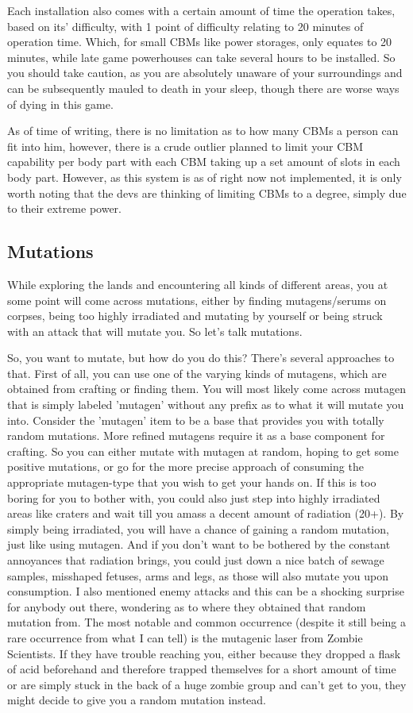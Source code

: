 \documentclass[11pt]{report}
\begin{document}
Each installation also comes with a certain amount of time the operation takes, based on its' difficulty, with 1 point of difficulty relating to 20 minutes of operation time. Which, for small CBMs like power storages, only equates to 20 minutes, while late game powerhouses can take several hours to be installed. So you should take caution, as you are absolutely unaware of your surroundings and can be subsequently mauled to death in your sleep, though there are worse ways of dying in this game.

As of time of writing, there is no limitation as to how many CBMs a person can fit into him, however, there is a crude outlier planned to limit your CBM capability per body part with each CBM taking up a set amount of slots in each body part. However, as this system is as of right now not implemented, it is only worth noting that the devs are thinking of limiting CBMs to a degree, simply due to their extreme power.

\subsection{Mutations}

While exploring the lands and encountering all kinds of different areas, you at some point will come across mutations, either by finding mutagens/serums on corpses, being too highly irradiated and mutating by yourself or being struck with an attack that will mutate you. So let's talk mutations.

So, you want to mutate, but how do you do this?
There's several approaches to that. First of all, you can use one of the varying kinds of mutagens, which are obtained from crafting or finding them. You will most likely come across mutagen that is simply labeled 'mutagen' without any prefix as to what it will mutate you into. Consider the 'mutagen' item to be a base that provides you with totally random mutations. More refined mutagens require it as a base component for crafting. So you can either mutate with mutagen at random, hoping to get some positive mutations, or go for the more precise approach of consuming the appropriate mutagen-type that you wish to get your hands on.
If this is too boring for you to bother with, you could also just step into highly irradiated areas like craters and wait till you amass a decent amount of radiation (20+). By simply being irradiated, you will have a chance of gaining a random mutation, just like using mutagen.
And if you don't want to be bothered by the constant annoyances that radiation brings, you could just down a nice batch of sewage samples, misshaped fetuses, arms and legs, as those will also mutate you upon consumption.
I also mentioned enemy attacks and this can be a shocking surprise for anybody out there, wondering as to where they obtained that random mutation from. The most notable and common occurrence (despite it still being a rare occurrence from what I can tell) is the mutagenic laser from Zombie Scientists. If they have trouble reaching you, either because they dropped a flask of acid beforehand and therefore trapped themselves for a short amount of time or are simply stuck in the back of a huge zombie group and can't get to you, they might decide to give you a random mutation instead.
\end{document}
